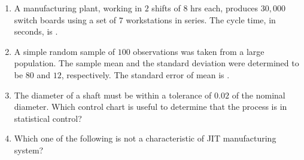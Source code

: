 \documentclass[journal,12pt,onecolumn]{IEEEtran}
\theoremstyle{remark}
\begin{document}
\begin{enumerate}
    \hfill{}

    \item A manufacturing plant, working in $2$ shifts of $8$ hrs each, produces $30,000$ switch boards using a set of $7$ workstations in series. The cycle time, in seconds, is \underline{\hspace{2cm}}.
    
    \hfill{}

    \item A simple random sample of $100$ observations was taken from a large population. The sample mean and the standard deviation were determined to be $80$ and $12$, respectively. The standard error of mean is \underline{\hspace{2cm}}.
    
    \hfill{}
    
    \item The diameter of a shaft must be within a tolerance of $0.02$ of the nominal diameter. Which control chart is useful to determine that the process is in statistical control?
    
    \hfill{}
    \begin{enumerate}
    \end{enumerate}
    
    \item Which one of the following is not a characteristic of JIT manufacturing system?
    
    \hfill{}
    \begin{enumerate}
    \end{enumerate}
    

\end{enumerate}
\end{document}
